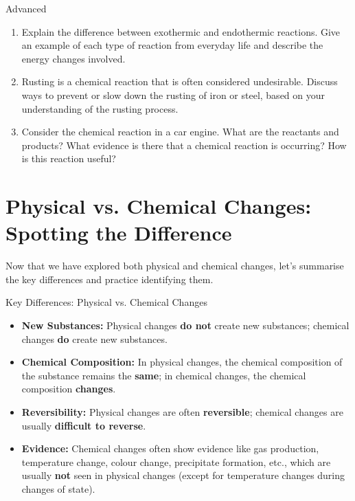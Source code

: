 \begin{tieredquestions}{Advanced}
\begin{enumerate}
    \item  Explain the difference between exothermic and endothermic reactions. Give an example of each type of reaction from everyday life and describe the energy changes involved.
    \item  Rusting is a chemical reaction that is often considered undesirable. Discuss ways to prevent or slow down the rusting of iron or steel, based on your understanding of the rusting process.
    \item  Consider the chemical reaction in a car engine. What are the reactants and products? What evidence is there that a chemical reaction is occurring? How is this reaction useful?
\end{enumerate}
\end{tieredquestions}


\section{Physical vs. Chemical Changes: Spotting the Difference}

Now that we have explored both physical and chemical changes, let's summarise the key differences and practice identifying them.

\begin{keyconcept}{Key Differences: Physical vs. Chemical Changes}
\begin{itemize}
    \item \textbf{New Substances:} Physical changes \textbf{do not} create new substances; chemical changes \textbf{do} create new substances.
    \item \textbf{Chemical Composition:} In physical changes, the chemical composition of the substance remains the \textbf{same}; in chemical changes, the chemical composition \textbf{changes}.
    \item \textbf{Reversibility:} Physical changes are often \textbf{reversible}; chemical changes are usually \textbf{difficult to reverse}.
    \item \textbf{Evidence:} Chemical changes often show evidence like gas production, temperature change, colour change, precipitate formation, etc., which are usually \textbf{not} seen in physical changes (except for temperature changes during changes of state).
\end{itemize}
\end{keyconcept}

